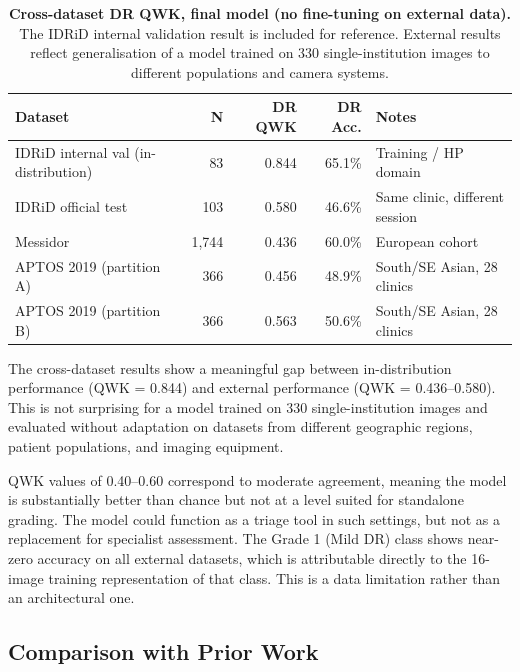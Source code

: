\documentclass[12pt,a4paper]{article}
\begin{document}
\begin{table}[H]
\centering
\small
\caption{\textbf{Cross-dataset DR QWK, final model (no fine-tuning on external data).} The IDRiD internal validation result is included for reference. External results reflect generalisation of a model trained on 330 single-institution images to different populations and camera systems.}
\begin{tabular}{|p{4cm}|r|r|r|p{3.5cm}|}
\hline
\textbf{Dataset} & \textbf{N} & \textbf{DR QWK} & \textbf{DR Acc.} & \textbf{Notes} \\
\hline
IDRiD internal val (in-distribution) & 83 & 0.844 & 65.1\% & Training / HP domain \\
IDRiD official test & 103 & 0.580 & 46.6\% & Same clinic, different session \\
Messidor & 1,744 & 0.436 & 60.0\% & European cohort \\
APTOS 2019 (partition A) & 366 & 0.456 & 48.9\% & South/SE Asian, 28 clinics \\
APTOS 2019 (partition B) & 366 & 0.563 & 50.6\% & South/SE Asian, 28 clinics \\
\hline
\end{tabular}
\end{table}

The cross-dataset results show a meaningful gap between in-distribution performance (QWK = 0.844) and external performance (QWK = 0.436--0.580). This is not surprising for a model trained on 330 single-institution images and evaluated without adaptation on datasets from different geographic regions, patient populations, and imaging equipment.

QWK values of 0.40--0.60 correspond to moderate agreement, meaning the model is substantially better than chance but not at a level suited for standalone grading. The model could function as a triage tool in such settings, but not as a replacement for specialist assessment. The Grade 1 (Mild DR) class shows near-zero accuracy on all external datasets, which is attributable directly to the 16-image training representation of that class. This is a data limitation rather than an architectural one.

\subsection{Comparison with Prior Work}
\end{document}
